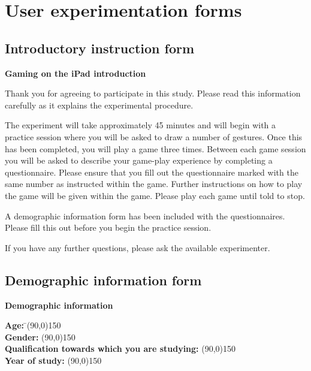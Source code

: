 \chapter{User experimentation forms}
\label{userExperForms}


\newpage
\section{Introductory instruction form}
\label{introInstruct}

{\bf \large Gaming on the iPad introduction}
\parindent 0cm
\parskip 0.5cm

Thank you for agreeing to participate in this study. Please read this information carefully as it explains the experimental procedure.

The experiment will take approximately 45 minutes and will begin with a practice session where you will be asked to draw a number of gestures. Once this has been completed, you will play a game three times. Between each game session you will be asked to describe your game-play experience by completing a questionnaire. Please ensure that you fill out the questionnaire marked with the same number as instructed within the game. Further instructions on how to play the game will be given within the game. Please play each game until told to stop.

A demographic information form has been included with the questionnaires. Please fill this out before you begin the practice session.

If you have any further questions, please ask the available experimenter.
\parindent 1cm
\parskip 0.0cm

\newpage
\section{Demographic information form}
\label{demographic}
\begin{center}
{\large \bf Demographic information}
\end{center}

\begin{tabbing}
{\bf Age:} \indent \indent \= \line(90,0){150} \\ 
{\bf Gender:} \> \line(90,0){150} \\ 
{\bf Qualification towards which you are studying:} \line(90,0){150} \\
{\bf Year of study:} \> \line(90,0){150} \\
\end{tabbing}

